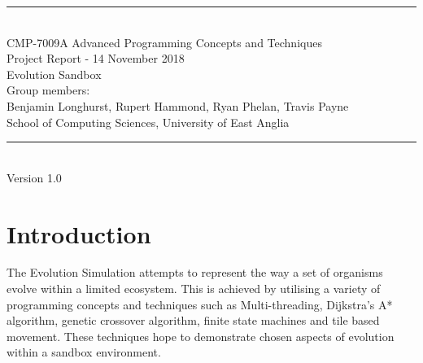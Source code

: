\documentclass[a4paper, oneside, 11pt]{report}
\begin{document}
\begin{titlepage}
\begin{center}
\rule{12cm}{1mm} \\
\vspace{1cm}
{\large  CMP-7009A Advanced Programming Concepts and Techniques}
\vspace{7.5cm}
\\{\Large Project Report - 14 November 2018}
\vspace{1.5cm}
\\{\LARGE Evolution Sandbox}
\vspace{1.0cm}
\\{\Large Group members: \\ Benjamin Longhurst, Rupert Hammond, Ryan Phelan, Travis Payne}
\vspace{10.0cm}
\\{\large School of Computing Sciences, University of East Anglia}
\\ \rule{12cm}{0.5mm}
\\ \hspace{8.5cm} {\large Version 1.0}
\end{center}
\end{titlepage}

\setcounter{page}{1}

\begin{abstract}
	The evolution simulation attempts to model natural life processes observed in organisms including predator prey relationships, natural selection through environmental pressures and the resulting outcomes. Using advanced programming techniques such as A* path-finding, multi-thread pooling and finite state machines, the project has been able to provide insight into the process of creating Artificial Life. This report outlines the development methodologies and technologies which drove the project.
\end{abstract}

\chapter{Introduction}
The Evolution Simulation attempts to represent the way a set of organisms evolve within a limited ecosystem. This is achieved by utilising a variety of programming concepts and techniques such as Multi-threading, Dijkstra's A* algorithm, genetic crossover algorithm, finite state machines and tile based movement. These techniques hope to demonstrate chosen aspects of evolution within a sandbox environment.
\end{document}
